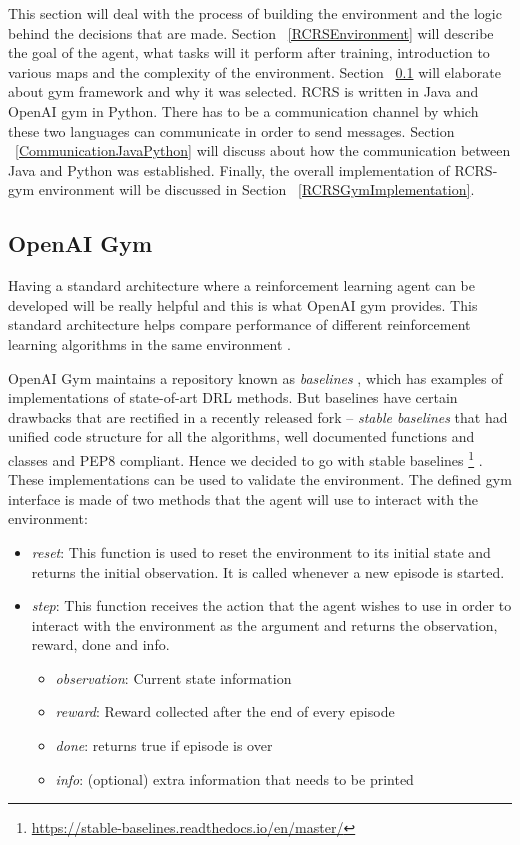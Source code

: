 \documentclass[12pt]{report}
\begin{document}
This section will deal with the process of building the environment and the logic behind the decisions that are made. Section ~\ref{RCRSEnvironment} will describe the goal of the agent, what tasks will it perform after training, introduction to various maps and the complexity of the environment. Section ~\ref{OpenAIGym} will elaborate about gym framework and why it was selected. RCRS is written in Java and OpenAI gym in Python. There has to be a communication channel by which these two languages can communicate in order to send messages. Section ~\ref{CommunicationJavaPython} will discuss about how the communication between Java and Python was established. Finally, the overall implementation of RCRS-gym environment will be discussed in Section ~\ref{RCRSGymImplementation}. 

\subsection{OpenAI Gym} \label{OpenAIGym}

Having a standard architecture where a reinforcement learning agent can be developed will be really helpful and this is what OpenAI gym provides. This standard architecture helps compare performance of different reinforcement learning algorithms in the same environment \cite{brockman2016openai}. 

OpenAI Gym maintains a repository known as \emph{baselines} \cite{baselines}, which has examples of implementations of state-of-art DRL methods. But baselines have certain drawbacks that are rectified in a recently released fork -- \emph{stable baselines} that had unified code structure for all the algorithms, well documented functions and classes and PEP8 compliant. Hence we decided to go with stable baselines \footnote{\url{https://stable-baselines.readthedocs.io/en/master/}}  \cite{stable-baselines}. These implementations can be used to validate the environment. The defined gym interface is made of two methods that the agent will use to interact with the environment:

\begin{itemize}
    \item \emph{reset}: This function is used to reset the environment to its initial state and returns the initial observation. It is called whenever a new episode is started. 
    \item \emph{step}: This function receives the action that the agent wishes to use in order to interact with the environment as the argument and returns the observation, reward, done and info. 
    \begin{itemize}
        \item \emph{observation}: Current state information
        \item \emph{reward}: Reward collected after the end of every episode
        \item \emph{done}: returns true if episode is over
        \item\emph{info}: (optional) extra information that needs to be printed
    \end{itemize}
\end{itemize}
\end{document}

